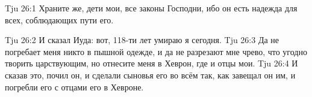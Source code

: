 \vs Tju 26:1
Храните же, дети мои, все законы Господни, ибо он есть надежда для всех,
соблюдающих пути его.

\vs Tju 26:2
И сказал Иуда: вот, 118-ти лет умираю я сегодня.
\vs Tju 26:3
Да не погребает меня никто в пышной одежде,
и да не разрезают мне чрево,
что угодно творить царствующим,
но отнесите меня в Хеврон, где и отцы мои.
\vs Tju 26:4
И сказав это, почил он, и сделали сыновья его во всём так, как
завещал он им, и погребли его с отцами его в Хевроне.
